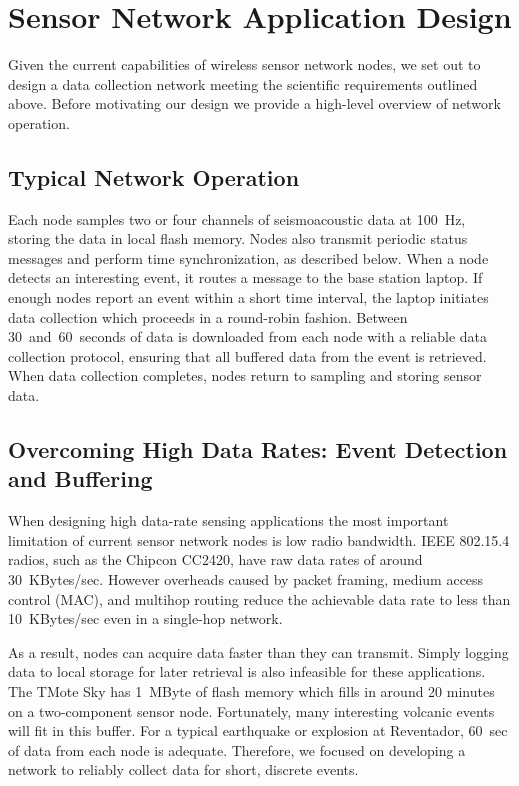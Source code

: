 \section{Sensor Network Application Design}
\label{sec-cs}

Given the current capabilities of wireless sensor network nodes, we set out to
design a data collection network meeting the scientific requirements outlined
above.  Before motivating our design we provide a high-level overview of
network operation.

\subsection{Typical Network Operation}

Each node samples two or four channels of seismoacoustic data at 100~Hz,
storing the data in local flash memory. Nodes also transmit periodic status
messages and perform time synchronization, as described below.
When a node detects an interesting event, it routes a message to the 
base station laptop.  
If enough nodes report an event within a short time interval, the laptop
initiates data collection which proceeds in a round-robin fashion. Between
30~and~60~seconds of data is downloaded from each node with a reliable data
collection protocol, ensuring that all buffered data from the event is
retrieved.  When data collection completes, nodes return to sampling 
and storing sensor data.

\subsection{Overcoming High Data Rates: Event Detection and Buffering}


When designing high data-rate sensing applications the most important
limitation of current sensor network nodes is low radio bandwidth.  IEEE
802.15.4 radios, such as the Chipcon CC2420, have raw data rates of around
30~KBytes/sec.  However overheads caused by packet framing, medium access
control (MAC), and multihop routing reduce the achievable data rate to less
than 10~KBytes/sec even in a single-hop network.

As a result, nodes can acquire data faster than they can transmit.  Simply
logging data to local storage for later retrieval is also infeasible for
these applications.  The TMote Sky has 1~MByte of flash memory which fills in
around 20 minutes on a two-component sensor node.  Fortunately, many
interesting volcanic events will fit in this buffer.  For a typical
earthquake or explosion at Reventador, 60~sec of data from each node is
adequate.  Therefore, we focused on developing a network to reliably collect
data for short, discrete events.  

